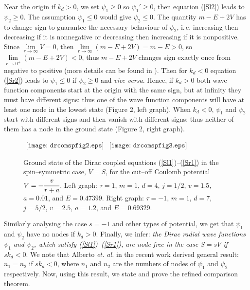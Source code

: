\documentclass[amsmath,amssymb,superscriptaddress,showkeys, showpacs, aps, nofootinbib]{revtex4}
\begin{document}
Near the origin if $k_d>0$, we set $\psi_1\ge 0$ so $\psi_1'\ge 0$, then equation (\ref{Sl2}) leads to $\psi_2\ge 0$. The assumption $\psi_1\le 0$ would give $\psi_2\le 0$. The quantity $m-E+2V$ has to change sign to guarantee the necessary behaviour of $\psi_2$, i.\,e. increasing then decreasing if it is nonnegative or decreasing then increasing if it is nonpositive. Since $\lim\limits_{r\to\infty}V=0$, then $\lim\limits_{r\to\infty}(m-E+2V)=m-E>0$, so $\lim\limits_{r\to 0^+}(m-E+2V)<0$, thus $m-E+2V$ changes sign exactly once from negative to positive (more details can be found in \cite{nod}). Then for $k_d<0$ equation (\ref{Sr2}) leads to $\psi_1\le 0$ if $\psi_2\ge 0$ and {\it vice versa}. Hence, if $k_d>0$ both wave function components start at the origin with the same sign, but at infinity they must have different signs: thus one of the wave function components will have at least one node in the lowest state (Figure 2, left graph). When $k_d<0$, $\psi_1$ and $\psi_2$ start with different signs and then vanish with different signs: thus neither of them has a node in the ground state (Figure 2, right graph). 
\begin{figure}[ht]
\begin{center}$
\begin{array}{cc}
\texttt{[image: drcomspfig2.eps]} & 
\texttt{[image: drcomspfig3.eps]}
\end{array}$
\end{center}
\caption{Ground state of the Dirac coupled equations (\ref{Sl1})--(\ref{Sr1}) in the spin--symmetric case, $V=S$, for the cut--off Coulomb potential \cite{cutoff_2, Barton, cutoff_1} $V=-\cfrac{v}{r+a}$. Left graph: $\tau=1$, $m=1$, $d=4$, $j=1/2$, $v=1.5$, $a=0.01$, and $E=0.47399$. Right graph: $\tau=-1$, $m=1$, $d=7$, $j=5/2$, $v=2.5$, $a=1.2$, and $E=0.69329$. }
\end{figure}
Similarly analysing the case $s=-1$ and other types of potential, we get that $\psi_1$ and $\psi_2$ have no nodes if $k_d>0$. Finally, we infer: {\it the Dirac radial wave functions $\psi_1$ and $\psi_2$, which satisfy (\ref{Sl1})--(\ref{Sr1}), are node free in the case $S=sV$ if $sk_d<0$}. We note that Alberto {\it et. al.} in the recent work \cite{Al} derived general result: $n_1=n_2$ if $sk_d<0$, where $n_1$ and $n_2$ are the numbers of nodes of $\psi_1$ and $\psi_2$ respectively. Now, using this result, we state and prove the refined comparison theorem. 

\newpage
\end{document}
